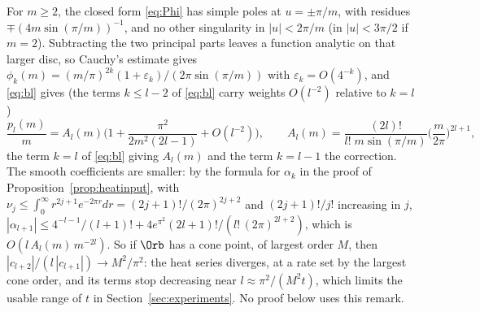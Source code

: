 %
%
%

\begin{remark}\label{rem:divergence}
For $m\ge2$, the closed form \eqref{eq:Phi} has simple poles at $u=\pm\pi/m$, with residues
$\mp(4m\sin(\pi/m))^{-1}$, and no other singularity in $|u|<2\pi/m$ (in $|u|<3\pi/2$ if $m=2$). Subtracting the two principal parts leaves a function analytic on that larger disc, so Cauchy's
estimate gives
$\phi_k(m)=(m/\pi)^{2k}(1+\varepsilon_k)/(2\pi\sin(\pi/m))$ with $\varepsilon_k=O(4^{-k})$, and \eqref{eq:bl}
gives (the terms $k\le l-2$ of \eqref{eq:bl} carry weights $O(l^{-2})$ relative to $k=l$)
\[
  \frac{p_l(m)}m=A_l(m)\Big(1+\frac{\pi^2}{2m^2(2l-1)}+O(l^{-2})\Big),\qquad
  A_l(m)=\frac{(2l)!}{l!\;m\sin(\pi/m)}\Big(\frac m{2\pi}\Big)^{2l+1},
\]
the term $k=l$ of \eqref{eq:bl} giving $A_l(m)$ and the term $k=l-1$ the correction. The smooth
coefficients are smaller: by the formula for $\alpha_k$ in the proof of Proposition~\ref{prop:heatinput},
with $\nu_j\le\int_0^\infty r^{2j+1}e^{-2\pi r}dr=(2j+1)!/(2\pi)^{2j+2}$ and $(2j+1)!/j!$ increasing in $j$,
$|\alpha_{l+1}|\le4^{-l-1}/(l+1)!+4e^{\pi^2}(2l+1)!/(l!\,(2\pi)^{2l+2})$, which is $O(l\,A_l(m)\,m^{-2l})$. So if
$\Orb$ has a cone point, of largest order $M$, then $|c_{l+2}|/(l\,|c_{l+1}|)\to M^2/\pi^2$: the heat
series diverges, at a rate set by the largest cone order, and its terms stop decreasing near
$l\approx\pi^2/(M^2t)$, which limits the usable range of $t$ in Section~\ref{sec:experiments}. No proof below uses this
remark.
\end{remark}

